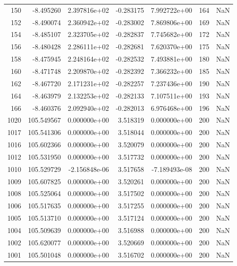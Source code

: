 \begin{tabular}{rrrrrrr}
 150 &  -8.495260 &  2.397816e+02 & -0.283175 &  7.992722e+00 &         164 & NaN \\
 152 &  -8.490074 &  2.360942e+02 & -0.283002 &  7.869806e+00 &         169 & NaN \\
 154 &  -8.485107 &  2.323705e+02 & -0.282837 &  7.745682e+00 &         172 & NaN \\
 156 &  -8.480428 &  2.286111e+02 & -0.282681 &  7.620370e+00 &         175 & NaN \\
 158 &  -8.475945 &  2.248164e+02 & -0.282532 &  7.493881e+00 &         180 & NaN \\
 160 &  -8.471748 &  2.209870e+02 & -0.282392 &  7.366232e+00 &         185 & NaN \\
 162 &  -8.467720 &  2.171231e+02 & -0.282257 &  7.237436e+00 &         190 & NaN \\
 164 &  -8.463979 &  2.132253e+02 & -0.282133 &  7.107511e+00 &         193 & NaN \\
 166 &  -8.460376 &  2.092940e+02 & -0.282013 &  6.976468e+00 &         196 & NaN \\
1020 & 105.549567 &  0.000000e+00 &  3.518319 &  0.000000e+00 &         200 & NaN \\
1017 & 105.541306 &  0.000000e+00 &  3.518044 &  0.000000e+00 &         200 & NaN \\
1016 & 105.602366 &  0.000000e+00 &  3.520079 &  0.000000e+00 &         200 & NaN \\
1012 & 105.531950 &  0.000000e+00 &  3.517732 &  0.000000e+00 &         200 & NaN \\
1010 & 105.529729 & -2.156848e-06 &  3.517658 & -7.189493e-08 &         200 & NaN \\
1009 & 105.607825 &  0.000000e+00 &  3.520261 &  0.000000e+00 &         200 & NaN \\
1008 & 105.525064 &  0.000000e+00 &  3.517502 &  0.000000e+00 &         200 & NaN \\
1006 & 105.517635 &  0.000000e+00 &  3.517255 &  0.000000e+00 &         200 & NaN \\
1005 & 105.513710 &  0.000000e+00 &  3.517124 &  0.000000e+00 &         200 & NaN \\
1004 & 105.509639 &  0.000000e+00 &  3.516988 &  0.000000e+00 &         200 & NaN \\
1002 & 105.620077 &  0.000000e+00 &  3.520669 &  0.000000e+00 &         200 & NaN \\
1001 & 105.501048 &  0.000000e+00 &  3.516702 &  0.000000e+00 &         200 & NaN \\

\end{tabular}
